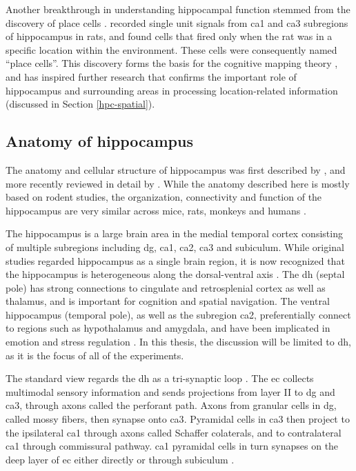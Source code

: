 Another breakthrough in understanding hippocampal function stemmed from the discovery of place cells \citep{o'keefe71}. \citet{o'keefe71} recorded single unit signals from \gls{ca1} and \gls{ca3} subregions of hippocampus in rats, and found cells that fired only when the rat was in a specific location within the environment. These cells were consequently named ``place cells''. This discovery forms the basis for the cognitive mapping theory \citep{o'keefe76}, and has inspired further research that confirms the important role of hippocampus and surrounding areas in processing location-related information (discussed in Section \ref{hpc-spatial}).

\subsection{Anatomy of hippocampus}
The anatomy and cellular structure of hippocampus was first described by \citet{cajal93} , and more recently reviewed in detail by \citet{strien09}. While the anatomy described here is mostly based on rodent studies, the organization, connectivity and function of the hippocampus are very similar across mice, rats, monkeys and humans \citep{clark13}. 

The hippocampus is a large brain area in the medial temporal cortex consisting of multiple subregions including \gls{dg}, \gls{ca1}, \gls{ca2}, \gls{ca3} and subiculum. While original studies regarded hippocampus as a single brain region, it is now recognized that the hippocampus is heterogeneous along the dorsal-ventral axis \citep{moser98, fanselow10}. The \gls{dh} (septal pole) has strong connections to cingulate and retrosplenial cortex as well as thalamus, and is important for cognition and spatial navigation. The ventral hippocampus (temporal pole), as well as the subregion \gls{ca2}, preferentially connect to regions such as hypothalamus and amygdala, and have been implicated in emotion and stress regulation \citep{fanselow10, chevaleyre16}. In this thesis, the discussion will be limited to \gls{dh}, as it is the focus of all of the experiments.

The standard view regards the \gls{dh} as a tri-synaptic loop \citep{strien09}. The \gls{ec} collects multimodal sensory information and sends projections from layer II to \gls{dg} and \gls{ca3}, through axons called the perforant path. Axons from granular cells in \gls{dg}, called mossy fibers, then synapse onto \gls{ca3}. Pyramidal cells in \gls{ca3} then project to the ipsilateral \gls{ca1} through axons called Schaffer colaterals, and to contralateral \gls{ca1} through commissural pathway. \gls{ca1} pyramidal cells in turn synapses on the deep layer of \gls{ec} either directly or through subiculum \citep{strien09}.

